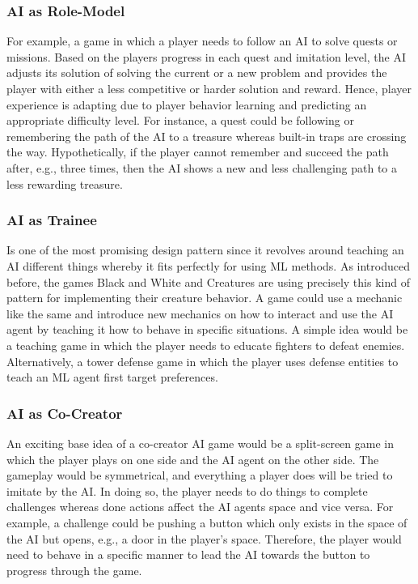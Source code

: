 \documentclass[MGS,Master,english]{twbook}%
\begin{document}
\subsubsection{AI as Role-Model}
For example, a game in which a player needs to follow an AI to solve quests or missions. Based on the players progress in each quest and imitation level, the AI adjusts its solution of solving the current or a new problem and provides the player with either a less competitive or harder solution and reward. Hence, player experience is adapting due to player behavior learning and predicting an appropriate difficulty level. For instance, a quest could be following or remembering the path of the AI to a treasure whereas built-in traps are crossing the way. Hypothetically, if the player cannot remember and succeed the path after, e.g., three times, then the AI shows a new and less challenging path to a less rewarding treasure.

\subsubsection{AI as Trainee}
Is one of the most promising design pattern since it revolves around teaching an AI different things whereby it fits perfectly for using ML methods. As introduced before, the games Black and White and Creatures are using precisely this kind of pattern for implementing their creature behavior. A game could use a mechanic like the same and introduce new mechanics on how to interact and use the AI agent by teaching it how to behave in specific situations. A simple idea would be a teaching game in which the player needs to educate fighters to defeat enemies. Alternatively, a tower defense game in which the player uses defense entities to teach an ML agent first target preferences.
	
\subsubsection{AI as Co-Creator}
An exciting base idea of a co-creator AI game would be a split-screen game in which the player plays on one side and the AI agent on the other side. The gameplay would be symmetrical, and everything a player does will be tried to imitate by the AI. In doing so, the player needs to do things to complete challenges whereas done actions affect the AI agents space and vice versa. For example, a challenge could be pushing a button which only exists in the space of the AI but opens, e.g., a door in the player's space. Therefore, the player would need to behave in a specific manner to lead the AI towards the button to progress through the game.
\end{document}
